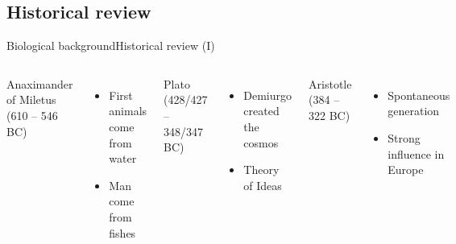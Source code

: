 \documentclass[10pt,compress]{beamer} %
\begin{document}
\subsection{Historical review}
\begin{frame}{Biological background}{Historical review (I)}
 	\begin{columns}
		Anaximander of Miletus (610 – 546 BC)

 	 	\begin{itemize}
		\item First animals come from water
		\item Man come from fishes
		\end{itemize}

		Plato (428/427 – 348/347 BC)
		\begin{itemize}
		\item Demiurgo created the cosmos
		\item Theory of Ideas
		\end{itemize}
		
		Aristotle (384 – 322 BC)
		\begin{itemize}
		\item Spontaneous generation
		\item Strong influence in Europe
		\end{itemize}
		\centering\includegraphics[width=\linewidth]{figs/plato.jpg}
	\end{columns}
\end{frame}
\end{document}
